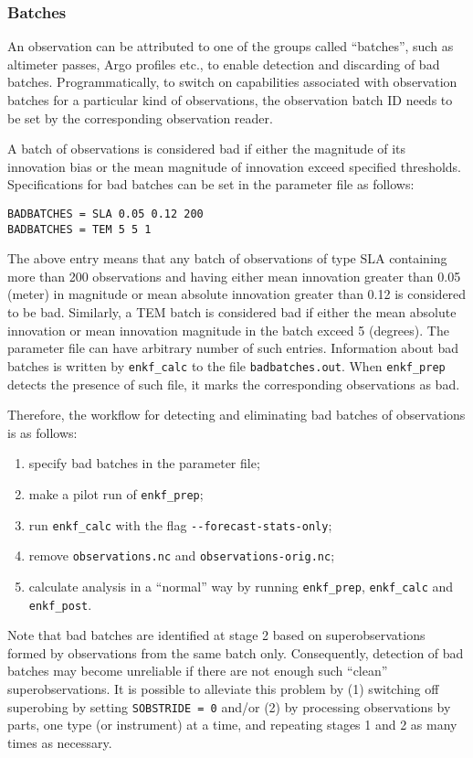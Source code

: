 \documentclass[11pt]{report}
\begin{document}
\subsubsection{Batches}

An observation can be attributed to one of the groups called ``batches'', such as altimeter passes, Argo profiles etc., to enable detection and discarding of bad batches.
Programmatically, to switch on capabilities associated with observation batches for a particular kind of observations, the observation batch ID needs to be set by the corresponding observation reader.

A batch of observations is considered bad if either the magnitude of its innovation bias or the mean magnitude of innovation exceed specified thresholds.
Specifications for bad batches can be set in the parameter file as follows:
\begin{Verbatim}[frame=single,fontsize=\footnotesize]
BADBATCHES = SLA 0.05 0.12 200
BADBATCHES = TEM 5 5 1
\end{Verbatim}
The above entry means that any batch of observations of type SLA containing more than 200 observations and having either mean innovation greater than 0.05 (meter) in magnitude or mean absolute innovation greater than 0.12 is considered to be bad.
Similarly, a TEM batch is considered bad if either the mean absolute innovation or mean innovation magnitude in the batch exceed 5 (degrees).
The parameter file can have arbitrary number of such entries.
Information about bad batches is written by \verb|enkf_calc| to the file \verb|badbatches.out|.
When \verb|enkf_prep| detects the presence of such file, it marks the corresponding observations as bad.

Therefore, the workflow for detecting and eliminating bad batches of observations is as follows:
\begin{enumerate}
\item specify bad batches in the parameter file;
\item make a pilot run of \verb|enkf_prep|;
\item run \verb|enkf_calc| with the flag \verb|--forecast-stats-only|;
\item remove \verb|observations.nc| and \verb|observations-orig.nc|;
\item calculate analysis in a ``normal'' way by running \verb|enkf_prep|, \verb|enkf_calc| and \verb|enkf_post|.
\end{enumerate}

Note that bad batches are identified at stage 2 based on superobservations formed by observations from the same batch only.
Consequently, detection of bad batches may become unreliable if there are not enough such ``clean'' superobservations.
It is possible to alleviate this problem by (1) switching off superobing by setting \verb|SOBSTRIDE = 0| and/or (2) by processing observations by parts, one type (or instrument) at a time, and repeating stages 1 and 2 as many times as necessary.
\end{document}
